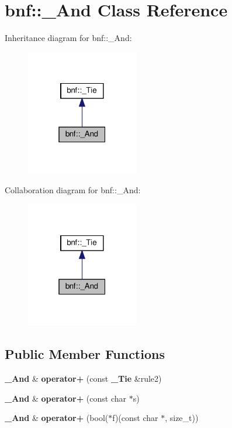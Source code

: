 \section{bnf\+:\+:\+\_\+\+And Class Reference}
\label{classbnf_1_1___and}


Inheritance diagram for bnf\+:\+:\+\_\+\+And\+:
\nopagebreak
\begin{figure}[H]
\begin{center}
\leavevmode
\includegraphics[width=139pt]{classbnf_1_1___and__inherit__graph}
\end{center}
\end{figure}


Collaboration diagram for bnf\+:\+:\+\_\+\+And\+:
\nopagebreak
\begin{figure}[H]
\begin{center}
\leavevmode
\includegraphics[width=139pt]{classbnf_1_1___and__coll__graph}
\end{center}
\end{figure}
\subsection*{Public Member Functions}
\begin{DoxyCompactItemize}
\item 
\mbox{\label{classbnf_1_1___and_af54576e9ade3afb5e1c1c0a36420596c}} 
\textbf{ \+\_\+\+And} \& {\bfseries operator+} (const \textbf{ \+\_\+\+Tie} \&rule2)
\item 
\mbox{\label{classbnf_1_1___and_ada6a76d66b9183ae9ba3ea834ea062eb}} 
\textbf{ \+\_\+\+And} \& {\bfseries operator+} (const char $\ast$s)
\item 
\mbox{\label{classbnf_1_1___and_afa5d2abd30d243c35566ee2597ebebf1}} 
\textbf{ \+\_\+\+And} \& {\bfseries operator+} (bool($\ast$f)(const char $\ast$, size\+\_\+t))
\end{DoxyCompactItemize}

